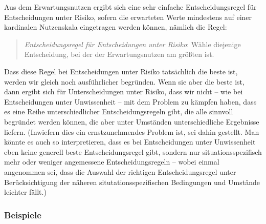 Aus dem Erwartungsnutzen ergibt sich eine sehr einfache Entscheidungsregel für
Entscheidungen unter Risiko, sofern die erwarteten Werte mindestens auf einer
kardinalen Nutzenskala eingetragen werden können, nämlich die Regel:
 
\begin{quote}\label{Erwartungsnutzenregel}
{\em Entscheidungsregel für Entscheidungen unter Risiko}: Wähle
die\-jenige Entscheidung, bei der der Erwartungsnutzen %
am größten ist.
\end{quote}

Dass diese Regel bei Entscheidungen unter Risiko tatsächlich die beste ist,
werden wir gleich noch ausführlicher begründen. Wenn sie aber die beste ist, dann
ergibt sich für Unterscheidungen unter Risiko, dass wir nicht -- wie bei
Entscheidungen unter Unwissenheit -- mit dem Problem zu kämpfen haben, dass es
eine Reihe unterschiedlicher Entscheidungsregeln gibt, die alle sinnvoll
begründet werden können, die aber unter Umständen unterschiedliche Ergebnisse
liefern. (Inwiefern dies ein ernstzunehmendes Problem ist, sei dahin gestellt.
Man könnte es auch so interpretieren, dass es bei Entscheidungen unter
Unwissenheit eben keine generell beste Entscheidungsregel gibt, sondern nur
situationsspezifisch mehr oder weniger angemessene Entscheidungsregeln -- wobei
einmal angenommen sei, dass die Auswahl der richtigen Entscheidungsregel unter
Berücksichtigung der näheren situtationsspezifischen Bedingungen und Umstände
leichter fällt.)

\subsubsection{Beispiele}

